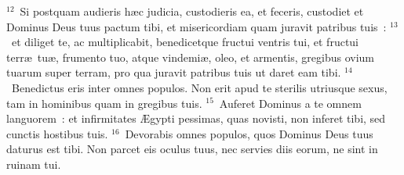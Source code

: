 ${}^{12}$~Si postquam audieris h\ae c judicia, custodieris ea, et feceris, custodiet et Dominus Deus tuus pactum tibi, et misericordiam quam juravit patribus tuis~:
${}^{13}$~et diliget te, ac multiplicabit, benedicetque fructui ventris tui, et fructui terr\ae\ tu\ae , frumento tuo, atque vindemi\ae , oleo, et armentis, gregibus ovium tuarum super terram, pro qua juravit patribus tuis ut daret eam tibi.
${}^{14}$~Benedictus eris inter omnes populos. Non erit apud te sterilis utriusque sexus, tam in hominibus quam in gregibus tuis.
${}^{15}$~Auferet Dominus a te omnem languorem~: et infirmitates \AE gypti pessimas, quas novisti, non inferet tibi, sed cunctis hostibus tuis.
${}^{16}$~Devorabis omnes populos, quos Dominus Deus tuus daturus est tibi. Non parcet eis oculus tuus, nec servies diis eorum, ne sint in ruinam tui.


